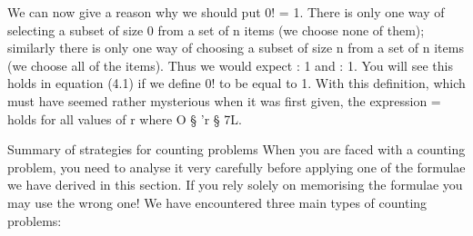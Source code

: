 \documentclass{beamer}
\begin{document}
\begin{frame}
We can now give a reason why we should put 0! = 1. There is only
one way of selecting a subset of size 0 from a set of n items (we
choose none of them); similarly there is only one way of choosing a
subset of size n from a set of n items (we choose all of the items).
Thus we would expect  : 1 and  : 1. You will see this holds in
equation (4.1) if we deﬁne 0! to be equal to 1. With this deﬁnition,
which must have seemed rather mysterious when it was ﬁrst given,
the expression  =  holds for all values of r where
O § 'r § 7L.
\end{frame}
\begin{frame}
Summary of strategies for counting problems
When you are faced with a counting problem, you need to analyse it
very carefully before applying one of the formulae we have derived
in this section. If you rely solely on memorising the formulae you
may use the wrong one! We have encountered three main types of
counting problems:

\end{frame}
\end{document}
